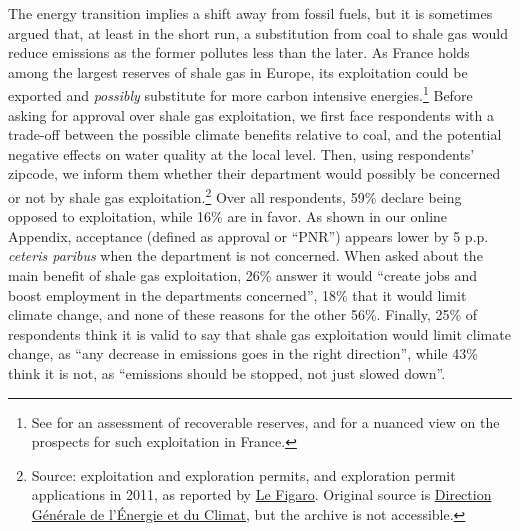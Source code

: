 \documentclass[english,5p,authoryear]{elsarticle}
\begin{document}
The energy transition implies a shift away from fossil fuels, but it is sometimes argued that, at least in the short run, a substitution from coal to shale gas would reduce emissions as the former pollutes less than the later. As France holds among the largest reserves of shale gas in Europe, its exploitation could be exported and \textit{possibly} substitute for more carbon intensive energies.\footnote{See \citet{eia_shale_2013} for an assessment of recoverable reserves, and \citet{saussey_2018} for a nuanced view on the prospects for such exploitation in France.} Before asking for approval over shale gas exploitation, we first face respondents with a trade-off between the possible climate benefits relative to coal, and the potential negative effects on water quality at the local level. Then, using respondents' zipcode, we inform them whether their department would possibly be concerned or not by shale gas exploitation.\footnote{Source: exploitation and exploration permits, and exploration permit applications in 2011, as reported by \hyperlink{http://www.lefigaro.fr/societes/2011/10/04/04015-20111004ARTFIG00465-gaz-de-schiste-total-veut-des-explications.php}{Le Figaro}. Original source is \hyperlink{http://www.minergies.fr/fr/cartographie}{Direction Générale de l'Énergie et du Climat}, but the archive is not accessible.} Over all respondents, 59\% declare being opposed to exploitation, while 16\% are in favor. As shown in our online Appendix, acceptance (defined as approval or ``PNR'') appears lower by 5 p.p. \textit{ceteris paribus} when the department is not concerned. When asked about the main benefit of shale gas exploitation, 26\% answer it would ``create jobs and boost employment in the departments concerned'', 18\% that it would limit climate change, and none of these reasons for the other 56\%. Finally, 25\% of respondents think it is valid to say that shale gas exploitation would limit climate change, as ``any decrease in emissions goes in the right direction'', while 43\% think it is not, as ``emissions should be stopped, not just slowed down''.

\end{document}
